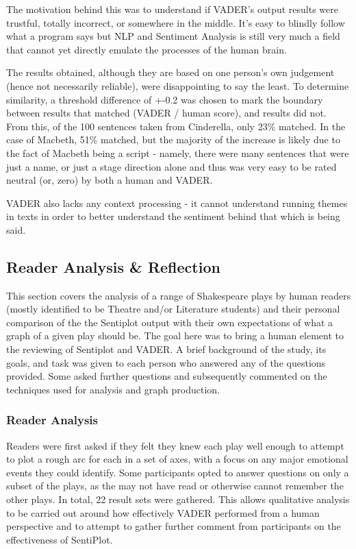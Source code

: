 \documentclass[a4paper]{article}
\begin{document}
        The motivation behind this was to understand if VADER's output results were trustful, totally incorrect, or somewhere in the middle. It's easy to blindly follow what a program says but NLP and Sentiment Analysis is still very much a field that cannot yet directly emulate the processes of the human brain.
	
	The results obtained, although they are based on one person's own judgement (hence not necessarily reliable), were disappointing to say the least. To determine similarity, a threshold difference of +-0.2 was chosen to mark the boundary between results that matched (VADER / human score), and results did not. From this, of the 100 sentences taken from Cinderella, only 23\% matched. In the case of Macbeth, 51\% matched, but the majority of the increase is likely due to the fact of Macbeth being a script - namely, there were many sentences that were just a name, or just a stage direction alone and thus was very easy to be rated neutral (or, zero) by both a human and VADER. 

        VADER also lacks any context processing - it cannot understand running themes in texts in order to better understand the sentiment behind that which is being said.
    \subsection{Reader Analysis \& Reflection}
    \label{subsec:reader}
        This section covers the analysis of a range of Shakespeare plays by human readers (mostly identified to be Theatre and/or Literature students) and their personal comparison of the the Sentiplot output with their own expectations of what a graph of a given play should be. The goal here was to bring a human element to the reviewing of Sentiplot and VADER. A brief background of the study, its goals, and task was given to each person who answered any of the questions provided. Some asked further questions and subsequently commented on the techniques used for analysis and graph production.
        \subsubsection{Reader Analysis}
            Readers were first asked if they felt they knew each play well enough to attempt to plot a rough arc for each in a set of axes, with a focus on any major emotional events they could identify. Some participants opted to answer questions on only a subset of the plays, as the may not have read or otherwise cannot remember the other plays. In total, 22 result sets were gathered. This allows qualitative analysis to be carried out around how effectively VADER performed from a human perspective and to attempt to gather further comment from participants on the effectiveness of SentiPlot.
\end{document}
